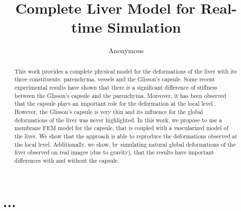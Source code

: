 \documentclass{llncs}
\begin{document}
%
%
\mainmatter              %
%
\title{Complete Liver Model for Real-time Simulation} %
%
%
\author{Anonymous}
%
%
%
\maketitle

\begin{abstract}
This work provides a complete physical model for the deformations of the liver with its three constituents: parenchyma, vessels and the Glisson's capsule.
Some recent experimental results \cite{Ahn2010} have shown that there is a significant difference of stiffness between the Glisson's capsule and the parenchyma. 
Moreover, it has been observed that the capsule plays an important role for the deformation at the local level \cite{Hollenstein2006}.
However, the Glisson's capsule is very thin and its influence for the global deformations of the liver was never highlighted.
In this work, we propose to use a membrane FEM model for the capsule, that is coupled with a vascularized model of the liver.
We show that the approach is able to reproduce the deformations observed at the local level.
Additionally, we show, by simulating natural global deformations of the liver observed on real images (due to gravity), that the results have important differences with and without the capsule.

\end{abstract}

\section{...}
\end{document}
